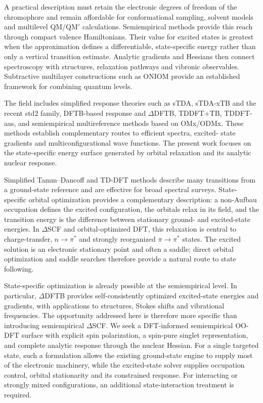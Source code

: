 \documentclass[11pt,a4paper]{article}
\begin{document}
A practical description must retain the electronic degrees of freedom of the
chromophore and remain affordable for conformational sampling, solvent
models and multilevel QM/QM$'$ calculations. Semiempirical methods provide
this reach through compact valence Hamiltonians. Their value for excited
states is greatest when the approximation defines a differentiable,
state-specific energy rather than only a vertical transition estimate.
Analytic gradients and Hessians then connect spectroscopy with structures,
relaxation pathways and vibronic observables. Subtractive multilayer
constructions such as ONIOM provide an established framework for combining
quantum levels.\cite{oniom2015}

The field includes simplified response theories such as sTDA, sTDA-xTB and
the recent std2 family, DFTB-based response and $\Delta$DFTB, TDDFT+TB,
TDDFT-aas, and semiempirical multireference methods based on OMx/ODMx.
\cite{tda,stdft2014,stdaxtb2016,std22026,dftb2025,deltadftb2016,tbgrad2023,aas2024,omxexc2016,odmx2019}
These methods establish complementary routes to efficient spectra, excited-
state gradients and multiconfigurational wave functions. The present work
focuses on the state-specific energy surface generated by orbital relaxation
and its analytic nuclear response.

Simplified Tamm--Dancoff and TD-DFT methods describe many transitions from a
ground-state reference and are effective for broad spectral surveys.\cite{tda,stdft2014,stdaxtb2016}
State-specific orbital optimization provides a complementary description: a
non-Aufbau occupation defines the excited configuration, the orbitals relax in
its field, and the transition energy is the difference between stationary
ground- and excited-state energies. In $\Delta$SCF and orbital-optimized DFT,
this relaxation is central to charge-transfer, $n\!\rightarrow\!\pi^*$ and
strongly reorganized $\pi\!\rightarrow\!\pi^*$ states.\cite{mom2008,hait2021}
The excited solution is an electronic stationary point and often a saddle;
direct orbital optimization and saddle searches therefore provide a natural
route to state following.\cite{levifaraday,levi2020,ivanov2021,gmf2023}

State-specific optimization is already possible at the semiempirical level. In particular, $\Delta$DFTB provides self-consistently optimized excited-state energies and gradients, with applications to structures, Stokes shifts and vibrational frequencies.\cite{deltadftb2016} The opportunity addressed here is therefore more specific than introducing semiempirical $\Delta$SCF. We seek a DFT-informed semiempirical OO-DFT surface with explicit spin polarization, a spin-pure singlet representation, and complete analytic response through the nuclear Hessian. For a single targeted state, such a formulation allows the existing ground-state engine to supply most of the electronic machinery, while the excited-state solver supplies occupation control, orbital stationarity and its constrained response. For interacting or strongly mixed configurations, an additional state-interaction treatment is required.
\end{document}
